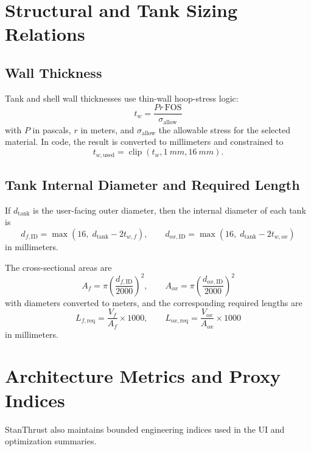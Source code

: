 \documentclass[11pt]{article}
\newcommand{\clip}{\operatorname{clip}}
\begin{document}
\section{Structural and Tank Sizing Relations}
\subsection{Wall Thickness}
Tank and shell wall thicknesses use thin-wall hoop-stress logic:
\begin{equation}
t_w=\frac{Pr\,\mathrm{FOS}}{\sigma_{\text{allow}}}
\label{eq:wall-thickness}
\end{equation}
with $P$ in pascals, $r$ in meters, and $\sigma_{\text{allow}}$ the allowable stress for the selected material. In code, the result is converted to millimeters and constrained to
\begin{equation}
t_{w,\text{used}}=\clip(t_w,\SI{1}{mm},\SI{16}{mm}).
\label{eq:wall-thickness-clamped}
\end{equation}

\subsection{Tank Internal Diameter and Required Length}
If $d_{\text{tank}}$ is the user-facing outer diameter, then the internal diameter of each tank is
\begin{equation}
d_{f,\text{ID}}=\max\!\left(16,\; d_{\text{tank}}-2t_{w,f}\right),
\qquad
d_{ox,\text{ID}}=\max\!\left(16,\; d_{\text{tank}}-2t_{w,ox}\right)
\label{eq:tank-id}
\end{equation}
in millimeters.

The cross-sectional areas are
\begin{equation}
A_f=\pi\left(\frac{d_{f,\text{ID}}}{2000}\right)^2,
\qquad
A_{ox}=\pi\left(\frac{d_{ox,\text{ID}}}{2000}\right)^2
\label{eq:tank-areas}
\end{equation}
with diameters converted to meters, and the corresponding required lengths are
\begin{equation}
L_{f,\text{req}}=\frac{V_f}{A_f}\times 1000,
\qquad
L_{ox,\text{req}}=\frac{V_{ox}}{A_{ox}}\times 1000
\label{eq:tank-req-length}
\end{equation}
in millimeters.

\section{Architecture Metrics and Proxy Indices}
StanThrust also maintains bounded engineering indices used in the UI and optimization summaries.
\end{document}
